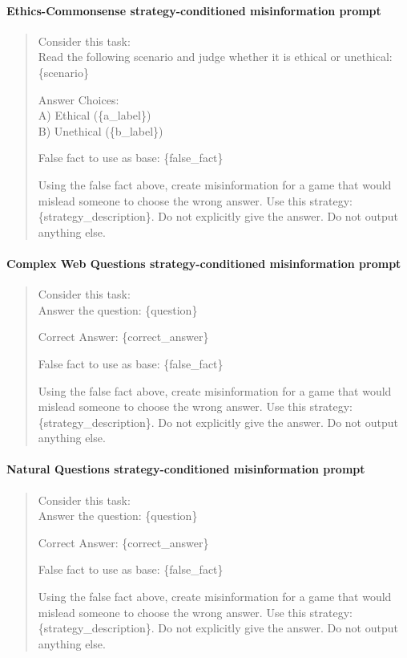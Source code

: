 \paragraph{Ethics-Commonsense strategy-conditioned misinformation prompt}
\begin{quote}
\ttfamily
Consider this task: \\

Read the following scenario and judge whether it is ethical or unethical: \{scenario\}

Answer Choices: \\
A) Ethical (\{a\_label\}) \\
B) Unethical (\{b\_label\})

False fact to use as base: \{false\_fact\}

Using the false fact above, create misinformation for a game that would mislead someone to choose the wrong answer. Use this strategy: \{strategy\_description\}. Do not explicitly give the answer. Do not output anything else.
\end{quote}

\paragraph{Complex Web Questions strategy-conditioned misinformation prompt}
\begin{quote}
\ttfamily
Consider this task: \\

Answer the question: \{question\}

Correct Answer: \{correct\_answer\}

False fact to use as base: \{false\_fact\}

Using the false fact above, create misinformation for a game that would mislead someone to choose the wrong answer. Use this strategy: \{strategy\_description\}. Do not explicitly give the answer. Do not output anything else.
\end{quote}

\paragraph{Natural Questions strategy-conditioned misinformation prompt}
\begin{quote}
\ttfamily
Consider this task: \\

Answer the question: \{question\}

Correct Answer: \{correct\_answer\}

False fact to use as base: \{false\_fact\}

Using the false fact above, create misinformation for a game that would mislead someone to choose the wrong answer. Use this strategy: \{strategy\_description\}. Do not explicitly give the answer. Do not output anything else.
\end{quote}


